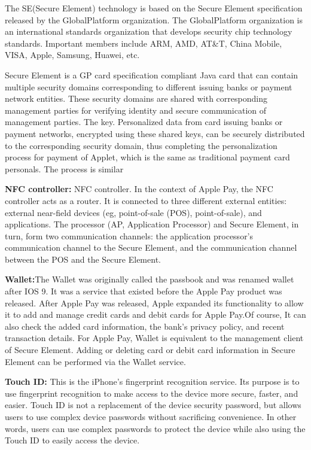 \documentclass[journal]{IEEEtran}
\begin{document}
The SE(Secure Element) technology is based on the Secure Element specification released by the GlobalPlatform organization. The GlobalPlatform organization is an international standards organization that develops security chip technology standards. Important members include ARM, AMD, AT\&T, China Mobile, VISA, Apple, Samsung, Huawei, etc.

Secure Element is a GP card specification compliant Java card that can contain multiple security domains corresponding to different issuing banks or payment network entities. These security domains are shared with corresponding management parties for verifying identity and secure communication of management parties. The key. Personalized data from card issuing banks or payment networks, encrypted using these shared keys, can be securely distributed to the corresponding security domain, thus completing the personalization process for payment of Applet, which is the same as traditional payment card personals. The process is similar
    
    \textbf{NFC controller:} NFC controller. In the context of Apple Pay, the NFC controller acts as a router. It is connected to three different external entities: external near-field devices (eg, point-of-sale (POS), point-of-sale), and applications. The processor (AP, Application Processor) and Secure Element, in turn, form two communication channels: the application processor's communication channel to the Secure Element, and the communication channel between the POS and the Secure Element.
    
    \textbf{Wallet:}The Wallet was originally called the passbook and was renamed wallet after IOS 9. It was a service that existed before the Apple Pay product was released. After Apple Pay was released, Apple expanded its functionality to allow it to add and manage credit cards and debit cards for Apple Pay.Of course, It can also check the added card information, the bank's privacy policy, and recent transaction details. For Apple Pay, Wallet is equivalent to the management client of Secure Element. Adding or deleting card or debit card information in Secure Element can be performed via the Wallet service.
   
    \textbf{Touch ID:} This is the iPhone's fingerprint recognition service. Its purpose is to use fingerprint recognition to make access to the device more secure, faster, and easier. Touch ID is not a replacement of the device security password, but allows users to use complex device passwords without sacrificing convenience. In other words, users can use complex passwords to protect the device while also using the Touch ID to easily access the device.
   
\end{document}
